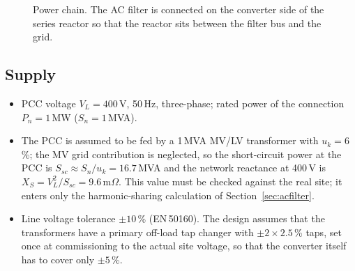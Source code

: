\documentclass[11pt,a4paper]{article}
\begin{document}
\begin{figure}[h]
\centering
{}
\caption{Power chain. The AC filter is connected on the converter side of the series reactor so that the reactor sits between the filter bus and the grid.}
\label{fig:chain}
\end{figure}

\subsection{Supply}

\begin{itemize}
\item PCC voltage $V_{L} = 400$\,V, 50\,Hz, three-phase; rated power of the connection $P_n = 1$\,MW ($S_n = 1$\,MVA).
\item The PCC is assumed to be fed by a 1\,MVA MV/LV transformer with $u_k = 6$\,\%; the MV grid contribution is neglected, so the short-circuit power at the PCC is $S_{sc} \approx S_n/u_k = 16.7$\,MVA and the network reactance at 400\,V is $X_S = V_L^2/S_{sc} = 9.6$\,m$\Omega$. This value must be checked against the real site; it enters only the harmonic-sharing calculation of Section~\ref{sec:acfilter}.
\item Line voltage tolerance $\pm10$\,\% (EN\,50160). The design assumes that the transformers have a primary off-load tap changer with $\pm2\times2.5$\,\% taps, set once at commissioning to the actual site voltage, so that the converter itself has to cover only $\pm5$\,\%.
\end{itemize}
\end{document}
